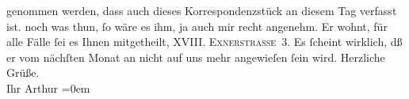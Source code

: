 \begin{ledgroupsized}[t]{13cm}
{{{                  genommen werden, dass auch dieses Korrespondenzstück an diesem Tag verfasst
                  ist.}}}\label{K_L00324-1h} noch was thun, ſo wäre es ihm, ja auch mir recht angenehm. Er wohnt,
               für alle Fälle ſei es Ihnen mitgetheilt, \textsc{XVIII. Exnerstraße 3}. Es ſcheint wirklich, dß er vom nächſten Monat {\pb}an
               nicht auf uns mehr angewieſen ſein wird.\pend
           \pstart
           Herzliche Grüße.{\\[\baselineskip]}Ihr \spacefill\mbox{Arthur}\pend
           \leftskip=0em{}
         
         \endnumbering{}\end{ledgroupsized}  \newcommand{\dateiname}{L00324}\newcommand{\titel}{Arthur Schnitzler an Hugo von Hofmannsthal, [15. 5. 1894?]}\newcommand{\editorInnen}{Martin Anton Müller und Gerd-Hermann Susen}
      